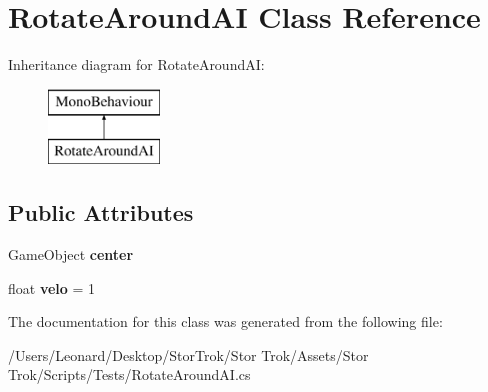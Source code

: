 \hypertarget{class_rotate_around_a_i}{}\section{Rotate\+Around\+AI Class Reference}
\label{class_rotate_around_a_i}
Inheritance diagram for Rotate\+Around\+AI\+:\begin{figure}[H]
\begin{center}
\leavevmode
\includegraphics[height=2.000000cm]{class_rotate_around_a_i}
\end{center}
\end{figure}
\subsection*{Public Attributes}
\begin{DoxyCompactItemize}
\item 
\mbox{\label{class_rotate_around_a_i_a2bf08a7e00a48c37ea3f03579c9922ad}} 
Game\+Object {\bfseries center}
\item 
\mbox{\label{class_rotate_around_a_i_a581e5be68757c022ee2e0f05d81db86f}} 
float {\bfseries velo} = 1
\end{DoxyCompactItemize}


The documentation for this class was generated from the following file\+:\begin{DoxyCompactItemize}
\item 
/\+Users/\+Leonard/\+Desktop/\+Stor\+Trok/\+Stor Trok/\+Assets/\+Stor Trok/\+Scripts/\+Tests/Rotate\+Around\+A\+I.\+cs\end{DoxyCompactItemize}

